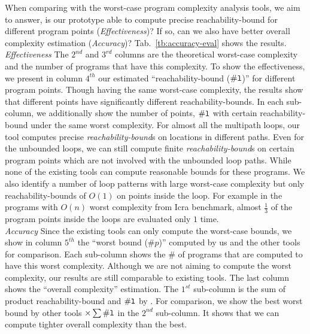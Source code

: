 When comparing with the worst-case program
complexity analysis tools, we aim to answer, is our prototype able to compute precise reachability-bound for different program points (\emph{Effectiveness})? If so, can we also have better overall complexity estimation (\emph{Accuracy})?
Tab.~\ref{tb:accuracy-eval} shows the results.
\\
\emph{Effectiveness}
\newcommand{\pointnum}{\kw{\# l}}
The $2^{nd}$ and $3^{rd}$ columns are the theoretical worst-case complexity and the number of programs that have this complexity.
To show the effectiveness, 
we present in column $4^{th}$ our estimated ``{reachability-bound ($\pointnum$)}'' for different program points. 
Though having the same worst-case complexity, the results show that different points have significantly different reachability-bounds.
In each sub-column, we additionally show the number of points, $\pointnum$ with certain reachability-bound under the same worst complexity.
For almost all the multipath loops, our tool computes precise \emph{reachability-bound}s on locations in different paths.
Even for the unbounded loops, we can still compute finite \emph{reachability-bound}s on certain program points which are not involved with the unbounded loop paths.
While none of the existing tools can compute reasonable bounds for these programs.
We also identify a number of loop patterns with large worst-case complexity but only reachability-bounds of $O(1)$ on points inside the loop.
For example in the programs  with $O(n)$ worst complexity from Icra benchmark,
almost $\frac{1}{3}$ of the program points inside the loops are evaluated only $1$ time.
\\
\emph{Accuracy} Since the existing tools can only compute the worst-case bounds,
we show in column $5^{th}$ the ``worst bound ($\# p$)'' computed by us and the other tools for comparison. Each sub-column shows the $\#$ of programs that are computed to have this worst complexity.
Although we are not aiming to compute the worst complexity, our results are still comparable to existing tools.
The last column shows the ``overall complexity'' estimation.
The $1^{st}$ sub-column is the sum of product reachability-bound and $\pointnum$ by {\THESYSTEM}.
For comparison, we show the best worst bound by other tools $\times \sum\pointnum$ in the $2^{nd}$ sub-column. It shows that we can compute tighter overall complexity than the best.
